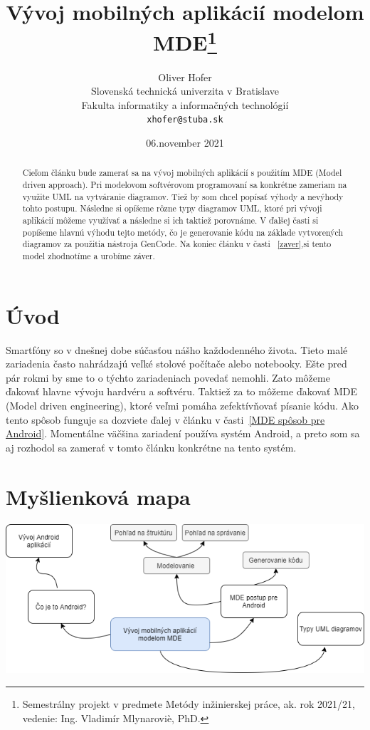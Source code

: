 \documentclass[10pt,twoside,slovak,a4paper]{article}
\title{Vývoj mobilných aplikácií modelom MDE\thanks{Semestrálny projekt v predmete Metódy inžinierskej práce, ak. rok 2021/21, vedenie: Ing. Vladimír Mlynaroviè, PhD.}} %
\author{Oliver Hofer\\[2pt]
	{\small Slovenská technická univerzita v Bratislave}\\
	{\small Fakulta informatiky a informačných technológií}\\
	{\small \texttt{xhofer@stuba.sk}}
	}
\date{\small 06.november  2021} %
\begin{document}
\maketitle

\begin{abstract}
Cieľom článku bude zamerať sa na vývoj mobilných aplikácií s použitím MDE (Model driven approach). Pri modelovom softvérovom programovaní sa konkrétne zameriam na využite UML na vytváranie diagramov. Tiež by som chcel popísať výhody a nevýhody tohto postupu. Následne si opíšeme rôzne typy diagramov UML, ktoré pri vývoji aplikácií môžeme využívať a následne si ich taktiež porovnáme. V ďalšej časti si popíšeme hlavnú výhodu tejto metódy, čo je generovanie kódu na základe vytvorených diagramov za použitia nástroja GenCode. Na koniec článku v časti ~\ref{zaver},si tento model zhodnotíme a urobíme záver.
\end{abstract}



\section{Úvod}
\cite{2012}
Smartfóny so v dnešnej dobe súčasťou nášho každodenného života. Tieto malé zariadenia často nahrádzajú veľké stolové počítače alebo notebooky. Ešte pred pár rokmi by sme to o týchto zariadeniach povedať nemohli. Zato môžeme ďakovať hlavne vývoju hardvéru a softvéru. \newline
Taktiež za to môžeme ďakovať MDE (Model driven engineering), ktoré veľmi pomáha zefektívňovať písanie kódu. Ako tento spôsob funguje sa dozviete ďalej v článku v časti~\ref{MDE spôsob pre Android}.\newline
Momentálne väčšina zariadení používa systém Android, a preto som sa aj rozhodol sa zamerať v tomto článku konkrétne na tento systém.

\newpage
\section{Myšlienková mapa} \label{Myšlienková mapa}


\includegraphics[scale=0.65]{myšlienková mapa.png}
\end{document}

